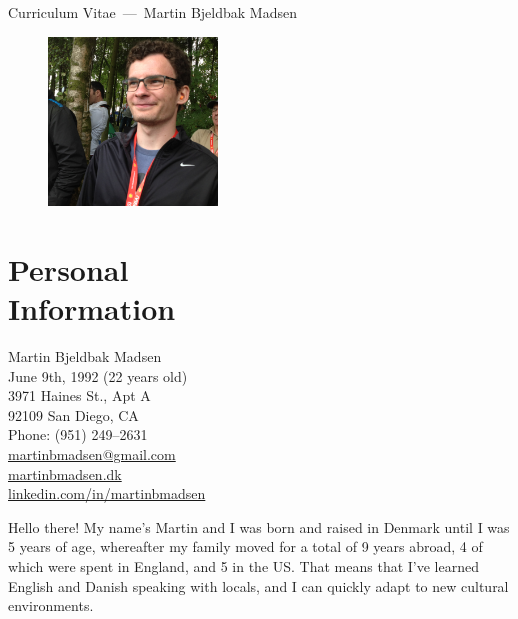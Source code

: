 \documentclass[margin,line]{resume}
\begin{document}
\raggedright%
{\sc \Large Curriculum Vitae~---~Martin Bjeldbak Madsen}
\begin{resume}
    \vspace{0.5cm}
    \begin{figure}
         \vspace{-1cm}
        \begin{center}
        \includegraphics[width=0.4\textwidth]{moi.png}
        \end{center}
         \vspace{-3.5cm}
    \end{figure}

    \section{\mysidestyle{} Personal\\Information}%
    Martin Bjeldbak Madsen\\
    June 9th, 1992 (22 years old)\\ 
    3971 Haines St., Apt A\\
    92109 San Diego, CA \\
    Phone: (951) 249--2631\\
    \href{mailto:martinbmadsen@gmail.com}{martinbmadsen@gmail.com}\\
    \href{http://martinbmadsen.dk}{martinbmadsen.dk}\\
    \href{http://dk.linkedin.com/in/martinbmadsen/}{linkedin.com/in/martinbmadsen}
    \vspace{1.25cm}

    Hello there! My name's Martin and I was born and raised in Denmark
    until I was 5 years of age, whereafter my family moved for a total
    of 9 years abroad, 4 of which were spent in England, and 5 in the
    US\@. That means that I've learned English and Danish speaking with
    locals, and I can quickly adapt to new cultural environments.


\end{resume}
\end{document}
